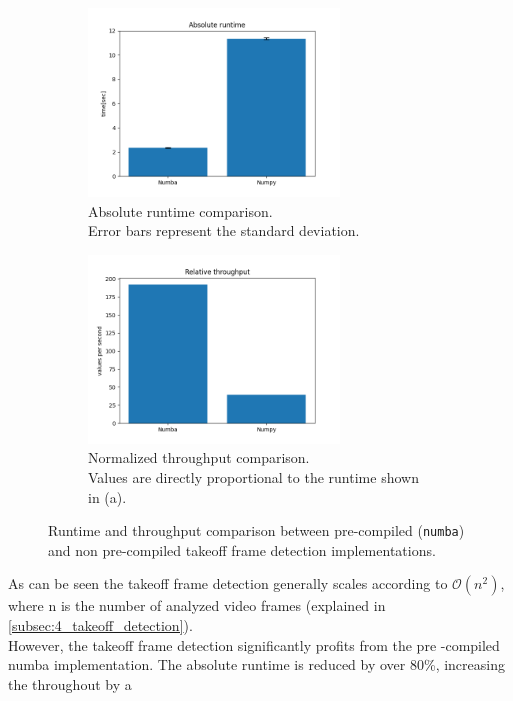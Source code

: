 \begin{figure}[!h]
    \begin{subfigure}[b]{0.48\textwidth}
        \includegraphics*[height=5cm]{absolute_runtime.png} %
        \caption{Absolute runtime comparison.\\
        Error bars represent the standard deviation.}
        \label{subfig:absolute_runtime_tkf_frame}
    \end{subfigure}
    \hfill
    \begin{subfigure}[b]{0.48\textwidth}
        \includegraphics*[height=5cm]{relative_throughput.png} 
        \caption{Normalized throughput comparison.\\
        Values are directly proportional to the runtime shown in (a).}
        \label{subfig:relative_throughput_tkf_frame}
    \end{subfigure}
    \caption[Takeoff frame detection performance]{Runtime and throughput
    comparison between pre-compiled (\texttt{numba}) and non
    pre-compiled takeoff frame detection implementations.}
    \label{fig:takeoff_frame_detection_performance}
\end{figure}
\FloatBarrier
\noindent As can be seen the takeoff frame detection generally scales
according to $\mathcal{O}(n^2)$, where n is the number of analyzed video
frames (explained in \autoref{subsec:4_takeoff_detection}).\\
However, the takeoff frame detection significantly profits from the pre
-compiled numba implementation.
The absolute runtime is reduced by over 80\%, increasing the throughout by a
